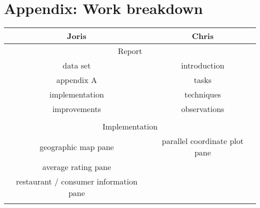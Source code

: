 \section{Appendix: Work breakdown}\label{app:appB}


\begin{center}
  \begin{tabular}{| c | c |}
    \hline
    Joris & Chris \\ \hline\hline
    \multicolumn{2}{|c|}{Report} \\ \hline\hline
    data set &  introduction\\ \hline
    appendix A &  tasks\\ \hline
    implementation &  techniques\\ \hline
    improvements & observations \\ \hline\hline
     &  \\ \hline\hline
    \multicolumn{2}{|c|}{Implementation} \\ \hline\hline
    geographic map pane & parallel coordinate plot pane \\ \hline
    average rating pane &  \\ \hline
    restaurant / consumer information pane &  \\ \hline
     &  \\ \hline
  \end{tabular}
\end{center}



